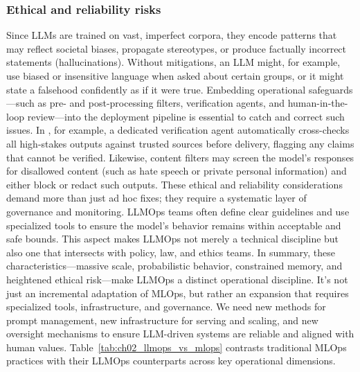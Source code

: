 \subsubsection{Ethical and reliability risks} Since LLMs are trained on vast, imperfect corpora, they encode patterns that may reflect societal biases, propagate stereotypes, or produce factually incorrect statements (hallucinations). Without mitigations, an LLM might, for example, use biased or insensitive language when asked about certain groups, or it might state a falsehood confidently as if it were true. Embedding operational safeguards—such as pre- and post-processing filters, verification agents, and human-in-the-loop review—into the deployment pipeline is essential to catch and correct such issues. In \ishtar{}, for example, a dedicated verification agent automatically cross-checks all high-stakes outputs against trusted sources before delivery, flagging any claims that cannot be verified. Likewise, content filters may screen the model's responses for disallowed content (such as hate speech or private personal information) and either block or redact such outputs. These ethical and reliability considerations demand more than just ad hoc fixes; they require a systematic layer of governance and monitoring. LLMOps teams often define clear guidelines and use specialized tools to ensure the model's behavior remains within acceptable and safe bounds. This aspect makes LLMOps not merely a technical discipline but also one that intersects with policy, law, and ethics teams.
In summary, these characteristics—massive scale, probabilistic behavior, constrained memory, and heightened ethical risk—make LLMOps a distinct operational discipline. It's not just an incremental adaptation of MLOps, but rather an expansion that requires specialized tools, infrastructure, and governance. We need new methods for prompt management, new infrastructure for serving and scaling, and new oversight mechanisms to ensure LLM-driven systems are reliable and aligned with human values. Table~\ref{tab:ch02_llmops_vs_mlops} contrasts traditional MLOps practices with their LLMOps counterparts across key operational dimensions.

